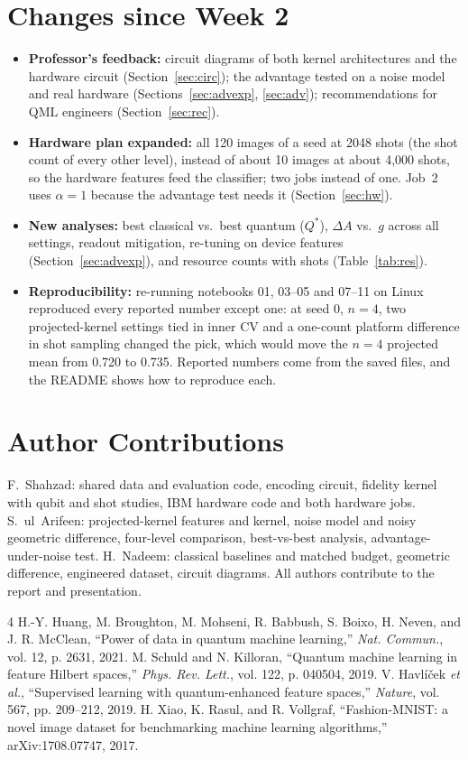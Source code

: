 \documentclass[conference]{IEEEtran}
\begin{document}
\section{Changes since Week 2}\label{sec:changes}
\begin{itemize}
\item \textbf{Professor's feedback:} circuit diagrams of both kernel architectures and the hardware circuit (Section~\ref{sec:circ}); the advantage tested on a noise model and real hardware (Sections~\ref{sec:advexp}, \ref{sec:adv}); recommendations for QML engineers (Section~\ref{sec:rec}).
\item \textbf{Hardware plan expanded:} all 120 images of a seed at 2048 shots (the shot count of every other level), instead of about 10 images at about 4{,}000 shots, so the hardware features feed the classifier; two jobs instead of one. Job~2 uses $\alpha=1$ because the advantage test needs it (Section~\ref{sec:hw}).
\item \textbf{New analyses:} best classical vs.\ best quantum ($Q^\ast$), $\Delta A$ vs.\ $g$ across all settings, readout mitigation, re-tuning on device features (Section~\ref{sec:advexp}), and resource counts with shots (Table~\ref{tab:res}).
\item \textbf{Reproducibility:} re-running notebooks 01, 03--05 and 07--11 on Linux reproduced every reported number except one: at seed 0, $n=4$, two projected-kernel settings tied in inner CV and a one-count platform difference in shot sampling changed the pick, which would move the $n=4$ projected mean from 0.720 to 0.735. Reported numbers come from the saved files, and the README shows how to reproduce each.
\end{itemize}

\section*{Author Contributions}
F.~Shahzad: shared data and evaluation code, encoding circuit, fidelity kernel with qubit and shot studies, IBM hardware code and both hardware jobs. S.~ul~Arifeen: projected-kernel features and kernel, noise model and noisy geometric difference, four-level comparison, best-vs-best analysis, advantage-under-noise test. H.~Nadeem: classical baselines and matched budget, geometric difference, engineered dataset, circuit diagrams. All authors contribute to the report and presentation.

\begin{thebibliography}{4}
 H.-Y. Huang, M. Broughton, M. Mohseni, R. Babbush, S. Boixo, H. Neven, and J. R. McClean, ``Power of data in quantum machine learning,'' \textit{Nat. Commun.}, vol. 12, p. 2631, 2021.
 M. Schuld and N. Killoran, ``Quantum machine learning in feature Hilbert spaces,'' \textit{Phys. Rev. Lett.}, vol. 122, p. 040504, 2019.
 V. Havl\'{i}\v{c}ek \textit{et al.}, ``Supervised learning with quantum-enhanced feature spaces,'' \textit{Nature}, vol. 567, pp. 209--212, 2019.
 H. Xiao, K. Rasul, and R. Vollgraf, ``Fashion-MNIST: a novel image dataset for benchmarking machine learning algorithms,'' arXiv:1708.07747, 2017.
\end{thebibliography}
\end{document}
